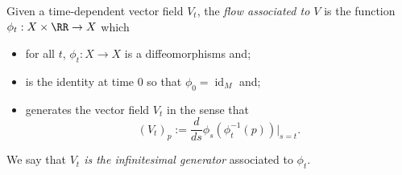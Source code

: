 

    Given a time-dependent vector field $V_t$,  the \emph{flow associated to $V$} is the function $\phi_t: X\times \RR\to X$ which
    \begin{itemize}
        \item for all $t$, $\phi_t:X\to X$ is a diffeomorphisms and;
        \item is the identity at time 0 so that $\phi_0=\operatorname{id}_M$ and;
        \item generates the vector field $V_t$ in the sense that 
            \[(V_t)_p:=\frac{d}{ds}\phi_s(\phi^{-1}_t(p))|_{s=t}.\]
    \end{itemize}
    We say that \emph{$ V_t$ is the infinitesimal generator} associated to $\phi_t$. 

